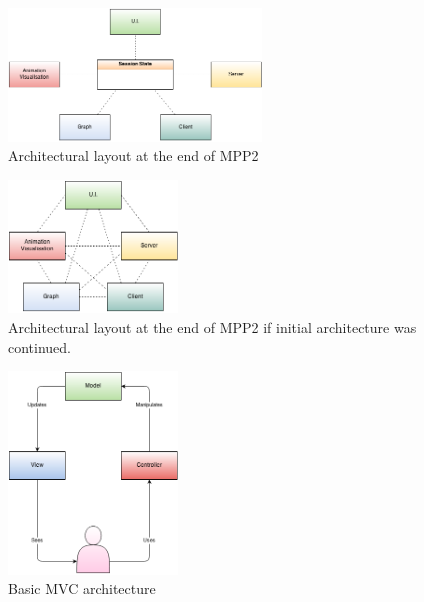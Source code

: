 \begin{figure}[h!]
    \centering
    \includegraphics[width=0.6\textwidth]{images/final_architecture.png}
    \caption{Architectural layout at the end of MPP2}
    \label{fig:final_architecture}
\end{figure}

\begin{figure}[h!]
    \centering
    \includegraphics[width=0.4\textwidth]{images/initial_architecture_future.png}
    \caption{Architectural layout at the end of MPP2 if initial architecture was continued.}
    \label{fig:initial_architecture_future}
\end{figure}

\begin{figure}[h!]
    \centering
    \includegraphics[width=0.4\textwidth]{images/mvc.png}
    \caption{Basic \ac{MVC} architecture}
    \label{fig:mvc}
\end{figure}

